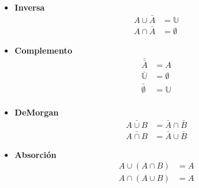 \begin{itemize}
\item \textbf{Inversa}
\begin{equation}
    \begin{array}{ll}
        A \cup \bar{A} & = \mathbb U \\
        A \cap \bar{A} & = \emptyset
    \end{array}
\end{equation}

\item \textbf{Complemento}
\begin{equation}
    \begin{array}{ll}
        \bar{\bar{A}} & = A \\
        \bar{\mathbb U} & = \emptyset \\
        \bar{\emptyset} & = \mathbb U \\
    \end{array}
\end{equation}

\item \textbf{DeMorgan}
\begin{equation}
    \begin{array}{ll}
        \bar{A \cup B} & = \bar{A} \cap \bar{B} \\
        \bar{A \cap B} & = \bar{A} \cup \bar{B}
    \end{array}
\end{equation}

\item \textbf{Absorción}
\begin{equation}
    \begin{array}{ll}
        A \cup (A \cap B) & = A \\
        A \cap (A \cup B) & = A
    \end{array}
\end{equation}

\end{itemize}
